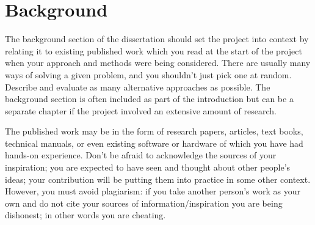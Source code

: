 \chapter{Background}
The background section of the dissertation should set the project into context by relating it to existing published work which you read at the start of the project when your approach and methods were being considered. There are usually many ways of solving a given problem, and you shouldn't just pick one at random. Describe and evaluate as many alternative approaches as possible. The background section is often included as part of the introduction but can be a separate chapter if the project involved an extensive amount of research.

The published work may be in the form of research papers, articles, text books, technical manuals, or even existing software or hardware of which you have had hands-on experience. Don't be afraid to acknowledge the sources of your inspiration; you are expected to have seen and thought about other people's ideas; your contribution will be putting them into practice in some other context. However, you must avoid plagiarism: if you take another person's work as your own and do not cite your sources of information/inspiration you are being dishonest; in other words you are cheating.